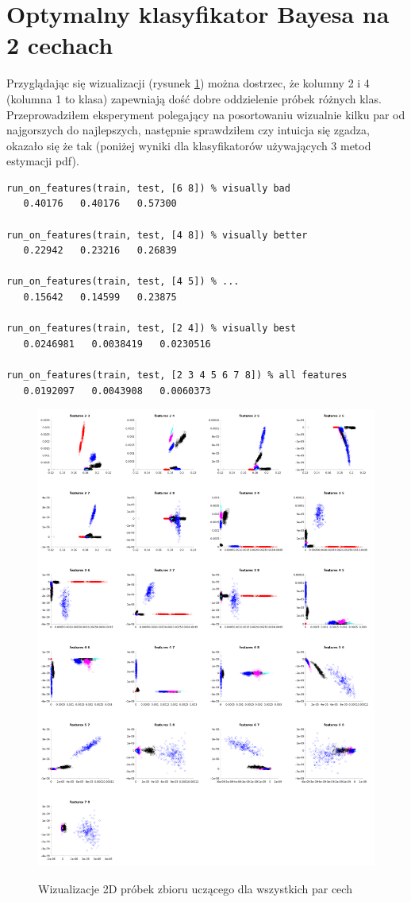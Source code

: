 \documentclass[a4paper]{article}
\begin{document}
\section{Optymalny klasyfikator Bayesa na 2 cechach}
Przyglądając się wizualizacji (rysunek \ref{fig:2D}) można dostrzec,
że kolumny 2 i 4 (kolumna 1 to klasa) zapewniają dość dobre oddzielenie próbek różnych klas.
Przeprowadziłem eksperyment polegający na posortowaniu wizualnie kilku par od najgorszych do najlepszych,
następnie sprawdziłem czy intuicja się zgadza, okazało się że tak
(poniżej wyniki dla klasyfikatorów używających 3 metod estymacji pdf).

\begin{verbatim}
run_on_features(train, test, [6 8]) % visually bad
   0.40176   0.40176   0.57300

run_on_features(train, test, [4 8]) % visually better
   0.22942   0.23216   0.26839

run_on_features(train, test, [4 5]) % ...
   0.15642   0.14599   0.23875

run_on_features(train, test, [2 4]) % visually best
   0.0246981   0.0038419   0.0230516

run_on_features(train, test, [2 3 4 5 6 7 8]) % all features
   0.0192097   0.0043908   0.0060373
\end{verbatim}
\begin{figure}[h]
    \caption[]{Wizualizacje 2D próbek zbioru uczącego dla wszystkich par cech}
    \centering
    \includegraphics[width=1.0\textwidth]{2features.png}
    \label{fig:2D}
\end{figure}
\end{document}
